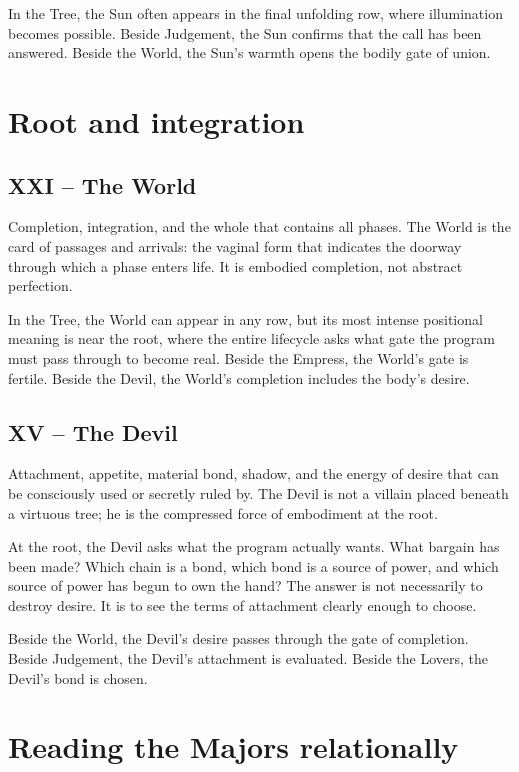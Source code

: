 In the Tree, the Sun often appears in the final unfolding row, where
illumination becomes possible. Beside Judgement, the Sun confirms that the call
has been answered. Beside the World, the Sun's warmth opens the bodily gate of
union.

\section{Root and integration}

\subsection{XXI -- The World}

Completion, integration, and the whole that contains all phases. The World is
the card of passages and arrivals: the vaginal form that indicates the doorway
through which a phase enters life. It is embodied completion, not abstract
perfection.

In the Tree, the World can appear in any row, but its most intense positional
meaning is near the root, where the entire lifecycle asks what gate the program
must pass through to become real. Beside the Empress, the World's gate is
fertile. Beside the Devil, the World's completion includes the body's desire.

\subsection{XV -- The Devil}

Attachment, appetite, material bond, shadow, and the energy of desire that can
be consciously used or secretly ruled by. The Devil is not a villain placed
beneath a virtuous tree; he is the compressed force of embodiment at the root.

At the root, the Devil asks what the program actually wants. What bargain has
been made? Which chain is a bond, which bond is a source of power, and which
source of power has begun to own the hand? The answer is not necessarily to
destroy desire. It is to see the terms of attachment clearly enough to choose.

Beside the World, the Devil's desire passes through the gate of completion.
Beside Judgement, the Devil's attachment is evaluated. Beside the Lovers, the
Devil's bond is chosen.

\section{Reading the Majors relationally}

